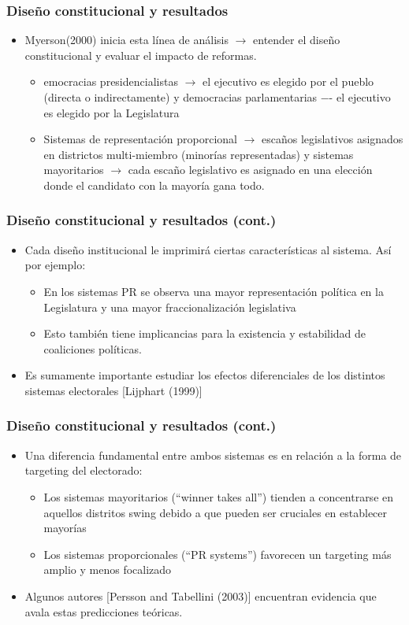 \documentclass[handout,final,xcolor=dvipsnames]{beamer}
\begin{document}
\begin{frame}\frametitle{Diseño constitucional y resultados}
\begin{itemize}\itemsep 15pt
\item Myerson(2000) inicia esta línea de análisis $\longrightarrow$ entender el diseño constitucional y
evaluar el impacto de reformas.
\begin{itemize}\itemsep 15pt \medskip
\item emocracias presidencialistas $\longrightarrow$ el ejecutivo es elegido por el pueblo (directa
o indirectamente) y democracias parlamentarias −- el ejecutivo es elegido por
la Legislatura
\item Sistemas de representación proporcional $\longrightarrow$ escaños legislativos
  asignados en districtos multi-miembro (minorías representadas) y sistemas mayoritarios $\longrightarrow$
cada escaño legislativo es asignado en una elección donde el candidato con la mayoría
gana todo.
\end{itemize}
\end{itemize}
\end{frame}


\begin{frame}\frametitle{Diseño constitucional y resultados (cont.)}
\begin{itemize}\itemsep 15pt
\item Cada diseño institucional le imprimirá ciertas características al sistema. Así por ejemplo:
\begin{itemize} \itemsep 15pt \medskip
\item En los sistemas PR se observa una mayor representación política en la Legislatura y
una mayor fraccionalización legislativa
\item Esto también tiene implicancias para la existencia y estabilidad
  de coaliciones políticas.
\end{itemize}
\item Es sumamente importante estudiar los efectos diferenciales de los distintos sistemas
electorales [Lijphart (1999)]
\end{itemize}
\end{frame}


\begin{frame}\frametitle{Diseño constitucional y resultados (cont.)}
\begin{itemize}\itemsep 15pt
\item Una diferencia fundamental entre ambos sistemas es en relación a la forma de targeting
del electorado:
\begin{itemize}\itemsep 15pt \medskip
\item Los sistemas mayoritarios (``winner takes all'') tienden a concentrarse en aquellos
distritos swing debido a que pueden ser cruciales en establecer mayorías
\item Los sistemas proporcionales (``PR systems'') favorecen un targeting más amplio y
menos focalizado
\end{itemize}
\item Algunos autores [Persson and Tabellini (2003)] encuentran evidencia que avala estas
predicciones teóricas.
\end{itemize}
\end{frame}
\end{document}
